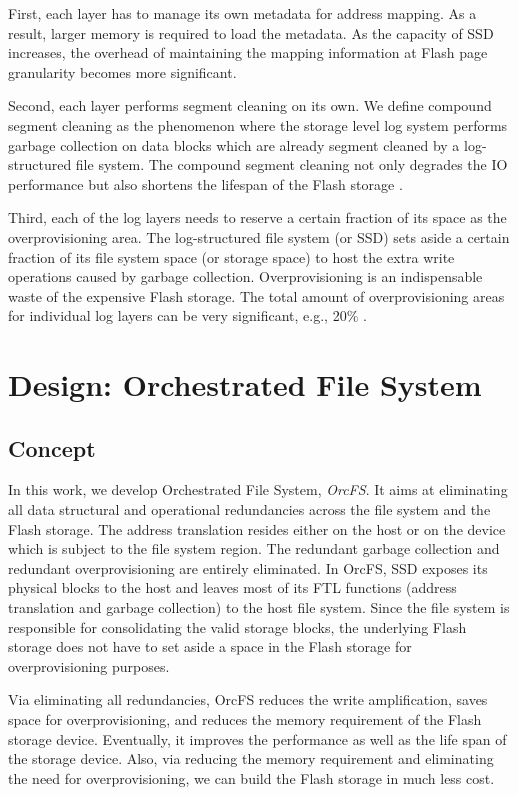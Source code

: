 \documentclass[prodmode,acmtecs]{acmsmall}
\begin{document}
First, each layer has to manage its own metadata for address
mapping. As a result, larger memory is required to load the
metadata. As the capacity of SSD increases, the overhead of
maintaining the mapping information at Flash page granularity becomes
more significant.

Second, each layer performs segment cleaning on its own. We define
compound segment cleaning as the phenomenon where the storage level
log system performs garbage collection on data blocks which are
already segment cleaned by a log-structured file system. The compound
segment cleaning not only degrades the IO performance but also
shortens the lifespan of the Flash storage  \cite{yang2014don,lee2016application,zhang2016parafs}. 

Third, each of the log layers needs to reserve a certain fraction of its
space as the overprovisioning area. The log-structured file system (or
SSD) sets aside a certain fraction of its file system space (or storage
space) to host the extra write operations caused by garbage
collection. Overprovisioning is an indispensable waste of the expensive
Flash storage. The total amount of overprovisioning areas for individual log
layers can be very significant, e.g., 20$\%$ \cite{sdf}. 


\section{Design: Orchestrated File System}
\label{sec:OrcFS_design}


\subsection{Concept}
In this work, we develop Orchestrated File System, \emph{OrcFS}. It
aims at eliminating all data structural and operational redundancies
across the file system and the Flash storage. The address translation
resides either on the host or on the device which is subject to the
file system region. The redundant garbage collection and redundant
overprovisioning are entirely eliminated.  In OrcFS, SSD exposes its
physical blocks to the host and leaves most of its FTL functions
(address translation and garbage collection) to the host
file system. Since the file system is responsible for consolidating the
valid storage blocks, the underlying Flash storage does not have to
set aside a space in the Flash storage for overprovisioning
purposes.

Via eliminating all redundancies, OrcFS reduces the write
amplification, saves space for overprovisioning, and reduces the memory
requirement of the Flash storage device. Eventually, it improves the
performance as well as the life span of the storage device. Also, via
reducing the memory requirement and eliminating the need for
overprovisioning, we can build the Flash storage in much less cost.
\end{document}
